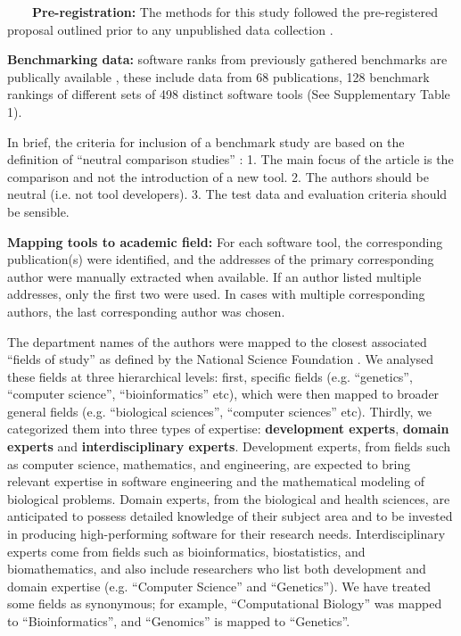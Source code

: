 \documentclass[fleqn,10pt,doc,onecolumn]{SelfArx}%
\begin{document}
~~~~\textbf{Pre-registration:} The methods for this study followed the pre-registered proposal outlined
prior to any unpublished data collection \cite{gardner2024}.

\textbf{Benchmarking data:} software ranks from previously gathered
benchmarks are publically available \cite{Gardner:2022}, these include data from
68 publications, \textcolor{rv}{128 benchmark rankings of} different sets of 498
distinct software tools (See Supplementary Table 1).

\textcolor{rv}{In brief, the criteria for inclusion of a
  benchmark study are based on the definition of ``neutral comparison
  studies'' \cite{boulesteix2013plea}: 1. The main focus of the
  article is the comparison and not the introduction of a new
  tool. 2. The authors should be neutral (i.e. not tool
  developers). 3. The test data and evaluation criteria should be
  sensible.}



\textbf{Mapping tools to academic field:} For each software tool, the
corresponding publication(s) were identified, and the addresses of the
primary corresponding author were manually extracted when
available. If an author listed multiple addresses, only the first two
were used. In cases with multiple corresponding authors, the last
corresponding author was chosen.


The department names of the authors were mapped to the closest
associated ``fields of study'' as defined by the National Science
Foundation \cite{fields2014}. We analysed these fields at three
hierarchical levels: first, specific fields (e.g. ``genetics'',
``computer science'', ``bioinformatics'' etc), which were then mapped
to broader general fields (e.g. ``biological sciences'', ``computer
sciences'' etc). Thirdly, we categorized them into three types of
expertise: \textbf{development experts}, \textbf{domain experts} and
\textbf{interdisciplinary experts}.  Development experts, from fields
such as computer science, mathematics, and engineering, are expected
to bring relevant expertise in software engineering and the
mathematical modeling of biological problems. Domain experts, from the
biological and health sciences, are anticipated to possess detailed
knowledge of their subject area and to be invested in producing
high-performing software for their research needs. Interdisciplinary
experts come from fields such as bioinformatics, biostatistics, and
biomathematics, and also include researchers who list both development
and domain expertise (e.g. ``Computer Science'' and ``Genetics''). We
have treated some fields as synonymous; for example, ``Computational
Biology'' was mapped to ``Bioinformatics'', and ``Genomics'' is mapped
to ``Genetics''.
\end{document}
